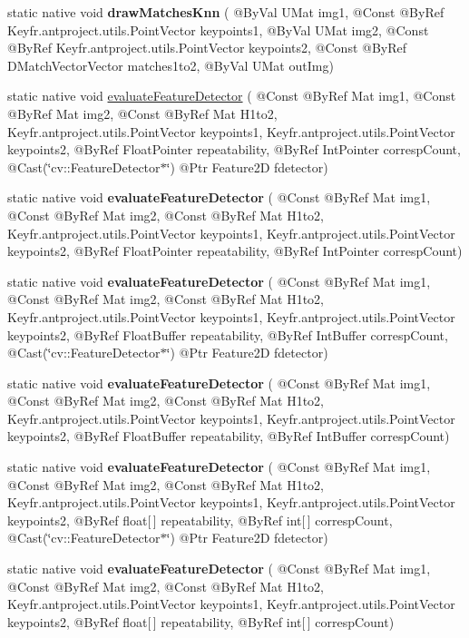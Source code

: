 \begin{DoxyCompactItemize}
\item 
static native void {\bfseries draw\+Matches\+Knn} ( @By\+Val U\+Mat img1, @Const @By\+Ref Key\+fr.antproject.utils.Point\+Vector keypoints1, @By\+Val U\+Mat img2, @Const @By\+Ref Key\+fr.antproject.utils.Point\+Vector keypoints2, @Const @By\+Ref D\+Match\+Vector\+Vector matches1to2, @By\+Val U\+Mat out\+Img)
\item 
static native void \hyperlink{group__features2d_gaae7a705a66cbdd0ed99122fe183a0e03}{evaluate\+Feature\+Detector} ( @Const @By\+Ref Mat img1, @Const @By\+Ref Mat img2, @Const @By\+Ref Mat H1to2, Key\+fr.antproject.utils.Point\+Vector keypoints1, Key\+fr.antproject.utils.Point\+Vector keypoints2, @By\+Ref Float\+Pointer repeatability, @By\+Ref Int\+Pointer corresp\+Count, @Cast(\char`\"{}cv\+::\+Feature\+Detector$\ast$\char`\"{}) @Ptr Feature2D fdetector)
\item 
static native void {\bfseries evaluate\+Feature\+Detector} ( @Const @By\+Ref Mat img1, @Const @By\+Ref Mat img2, @Const @By\+Ref Mat H1to2, Key\+fr.antproject.utils.Point\+Vector keypoints1, Key\+fr.antproject.utils.Point\+Vector keypoints2, @By\+Ref Float\+Pointer repeatability, @By\+Ref Int\+Pointer corresp\+Count)
\item 
static native void {\bfseries evaluate\+Feature\+Detector} ( @Const @By\+Ref Mat img1, @Const @By\+Ref Mat img2, @Const @By\+Ref Mat H1to2, Key\+fr.antproject.utils.Point\+Vector keypoints1, Key\+fr.antproject.utils.Point\+Vector keypoints2, @By\+Ref Float\+Buffer repeatability, @By\+Ref Int\+Buffer corresp\+Count, @Cast(\char`\"{}cv\+::\+Feature\+Detector$\ast$\char`\"{}) @Ptr Feature2D fdetector)
\item 
static native void {\bfseries evaluate\+Feature\+Detector} ( @Const @By\+Ref Mat img1, @Const @By\+Ref Mat img2, @Const @By\+Ref Mat H1to2, Key\+fr.antproject.utils.Point\+Vector keypoints1, Key\+fr.antproject.utils.Point\+Vector keypoints2, @By\+Ref Float\+Buffer repeatability, @By\+Ref Int\+Buffer corresp\+Count)
\item 
static native void {\bfseries evaluate\+Feature\+Detector} ( @Const @By\+Ref Mat img1, @Const @By\+Ref Mat img2, @Const @By\+Ref Mat H1to2, Key\+fr.antproject.utils.Point\+Vector keypoints1, Key\+fr.antproject.utils.Point\+Vector keypoints2, @By\+Ref float\mbox{[}$\,$\mbox{]} repeatability, @By\+Ref int\mbox{[}$\,$\mbox{]} corresp\+Count, @Cast(\char`\"{}cv\+::\+Feature\+Detector$\ast$\char`\"{}) @Ptr Feature2D fdetector)
\item 
static native void {\bfseries evaluate\+Feature\+Detector} ( @Const @By\+Ref Mat img1, @Const @By\+Ref Mat img2, @Const @By\+Ref Mat H1to2, Key\+fr.antproject.utils.Point\+Vector keypoints1, Key\+fr.antproject.utils.Point\+Vector keypoints2, @By\+Ref float\mbox{[}$\,$\mbox{]} repeatability, @By\+Ref int\mbox{[}$\,$\mbox{]} corresp\+Count)

\end{DoxyCompactItemize}
